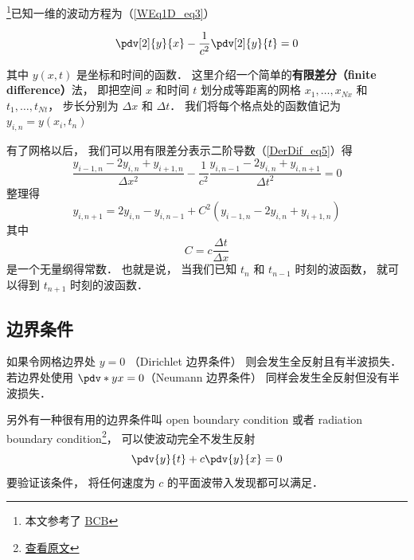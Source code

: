 

\footnote{本文参考了 \href{http://hplgit.github.io/num-methods-for-PDEs/doc/pub/wave/sphinx/._main_wave001.html\#discretizing-the-domain}{BCB}}已知一维的波动方程为（\autoref{WEq1D_eq3}）

\begin{equation}
\pdv[2]{y}{x} - \frac{1}{c^2}\pdv[2]{y}{t} = 0
\end{equation}

其中 $y(x, t)$ 是坐标和时间的函数． 这里介绍一个简单的\textbf{有限差分（finite difference）}法， 即把空间 $x$ 和时间 $t$ 划分成等距离的网格 $x_1, \dots, x_{Nx}$ 和 $t_1, \dots, t_{Nt}$， 步长分别为 $\Delta x$ 和 $\Delta t$． 我们将每个格点处的函数值记为 $y_{i,n} = y(x_i, t_n)$

有了网格以后， 我们可以用有限差分表示二阶导数（\autoref{DerDif_eq5}）得
\begin{equation}
\frac{y_{i-1,n} - 2y_{i,n} + y_{i+1,n}}{\Delta x^2} - \frac{1}{c^2} \frac{y_{i, n-1} - 2y_{i, n} + y_{i, n+1}}{\Delta t^2} = 0
\end{equation}
整理得
\begin{equation}
y_{i, n+1} = 2y_{i, n} - y_{i, n-1} + C^2(y_{i-1,n} - 2y_{i,n} + y_{i+1,n})
\end{equation}
其中
\begin{equation}
C = c \frac{\Delta t}{\Delta x}
\end{equation}
是一个无量纲得常数． 也就是说， 当我们已知 $t_n$ 和 $t_{n-1}$ 时刻的波函数， 就可以得到 $t_{n+1}$ 时刻的波函数．

\subsection{边界条件}
如果令网格边界处 $y = 0$ （Dirichlet 边界条件） 则会发生全反射且有半波损失． 若边界处使用 $\pdv*{y}{x} = 0$（Neumann 边界条件） 同样会发生全反射但没有半波损失．

另外有一种很有用的边界条件叫 open boundary condition 或者 radiation boundary condition\footnote{\href{http://hplgit.github.io/num-methods-for-PDEs/doc/pub/wave/sphinx/._main_wave003.html\#problem-11-implement-open-boundary-conditions}{查看原文}}， 可以使波动完全不发生反射
\begin{equation}
\pdv{y}{t} + c\pdv{y}{x} = 0
\end{equation}
要验证该条件， 将任何速度为 $c$ 的平面波带入发现都可以满足．

